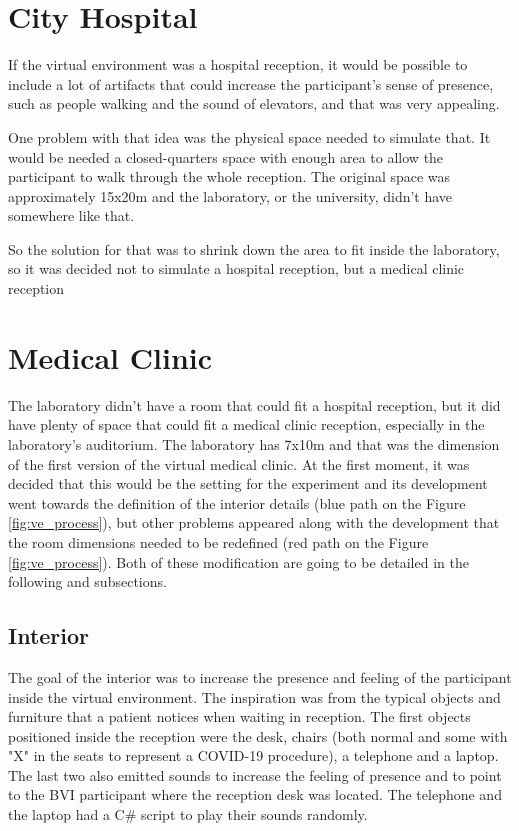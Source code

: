 \section{City Hospital}

    If the virtual environment was a hospital reception, it would be possible to include a lot of artifacts that could increase the participant's sense of presence, such as people walking and the sound of elevators, and that was very appealing.
    
    One problem with that idea was the physical space needed to simulate that. It would be needed a closed-quarters space with enough area to allow the participant to walk through the whole reception. The original space was approximately 15x20m and the laboratory, or the university, didn't have somewhere like that.
    
    So the solution for that was to shrink down the area to fit inside the laboratory, so it was decided not to simulate a hospital reception, but a medical clinic reception

\section{Medical Clinic}

    The laboratory didn't have a room that could fit a hospital reception, but it did have plenty of space that could fit a medical clinic reception, especially in the laboratory's auditorium. The laboratory has 7x10m and that was the dimension of the first version of the virtual medical clinic. At the first moment, it was decided that this would be the setting for the experiment and its development went towards the definition of the interior details (blue path on the Figure \ref{fig:ve_process}), but other problems appeared along with the development that the room dimensions needed to be redefined (red path on the Figure \ref{fig:ve_process}). Both of these modification are going to be detailed in the following  and  subsections.
    
    \subsection{Interior}
    \label{subsec:interior}
    
        The goal of the interior was to increase the presence and feeling of the participant inside the virtual environment. The inspiration was from the typical objects and furniture that a patient notices when waiting in reception. The first objects positioned inside the reception were the desk, chairs (both normal and some with "X" in the seats to represent a COVID-19 procedure), a telephone and a laptop. The last two also emitted sounds to increase the feeling of presence and to point to the BVI participant where the reception desk was located. The telephone and the laptop had a C\# script to play their sounds randomly.
        
